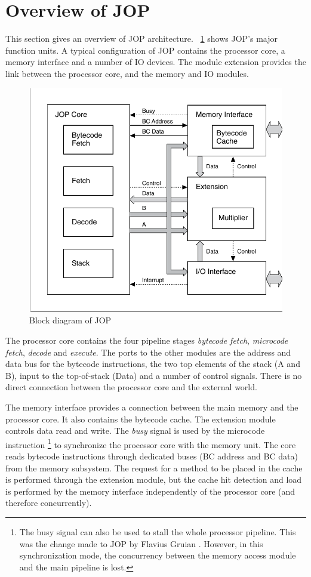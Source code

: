 \section{Overview of JOP}

This section gives an overview of JOP architecture.
\figurename~\ref{fig:arch:jop:block} shows JOP's major function
units. A typical configuration of JOP contains the processor core, a
memory interface and a number of IO devices. The module extension
provides the link between the processor core, and the memory and IO
modules.

\begin{figure}
    \centering
    \includegraphics[scale=\picscale]{arch/arch_jop_block}
    \caption{Block diagram of JOP}
    \label{fig:arch:jop:block}
\end{figure}

The processor core contains the four pipeline stages \emph{bytecode
fetch}, \emph{microcode fetch}, \emph{decode} and \emph{execute}.
The ports to the other modules are the address and data bus for the
bytecode instructions, the two top elements of the stack (A and B),
input to the top-of-stack (Data) and a number of control signals.
There is no direct connection between the processor core and the
external world.

The memory interface provides a connection between the main memory
and the processor core. It also contains the bytecode cache. The
extension module controls data read and write. The \emph{busy}
signal is used by the microcode instruction \footnote{The
busy signal can also be used to stall the whole processor pipeline.
This was the change made to JOP by Flavius Gruian \cite{jop:sac05}.
However, in this synchronization mode, the concurrency between the
memory access module and the main pipeline is lost.} to synchronize
the processor core with the memory unit. The core reads bytecode
instructions through dedicated buses (BC address and BC data) from
the memory subsystem. The request for a method to be placed in the
cache is performed through the extension module, but the cache hit
detection and load is performed by the memory interface
independently of the processor core (and therefore concurrently).

